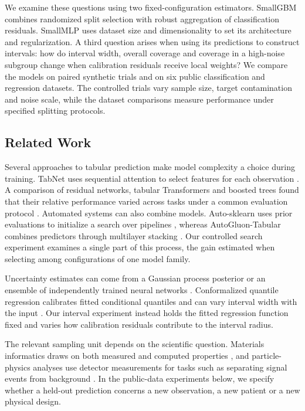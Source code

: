 \documentclass[journal]{IEEEtran}
\begin{document}
We examine these questions using two fixed-configuration estimators. SmallGBM combines randomized split selection with robust aggregation of classification residuals. SmallMLP uses dataset size and dimensionality to set its architecture and regularization. A third question arises when using its predictions to construct intervals: how do interval width, overall coverage and coverage in a high-noise subgroup change when calibration residuals receive local weights? We compare the models on paired synthetic trials and on six public classification and regression datasets. The controlled trials vary sample size, target contamination and noise scale, while the dataset comparisons measure performance under specified splitting protocols.

\subsection{Related Work}

Several approaches to tabular prediction make model complexity a choice during training. TabNet uses sequential attention to select features for each observation \cite{arik2021tabnet}. A comparison of residual networks, tabular Transformers and boosted trees found that their relative performance varied across tasks under a common evaluation protocol \cite{gorishniy2021revisiting}. Automated systems can also combine models. Auto-sklearn uses prior evaluations to initialize a search over pipelines \cite{feurer2015automl}, whereas AutoGluon-Tabular combines predictors through multilayer stacking \cite{erickson2020autogluon}. Our controlled search experiment examines a single part of this process, the gain estimated when selecting among configurations of one model family.

Uncertainty estimates can come from a Gaussian process posterior \cite{rasmussen2006gpml} or an ensemble of independently trained neural networks \cite{lakshminarayanan2017ensembles}. Conformalized quantile regression calibrates fitted conditional quantiles and can vary interval width with the input \cite{romano2019cqr}. Our interval experiment instead holds the fitted regression function fixed and varies how calibration residuals contribute to the interval radius.

The relevant sampling unit depends on the scientific question. Materials informatics draws on both measured and computed properties \cite{ramprasad2017materials}, and particle-physics analyses use detector measurements for tasks such as separating signal events from background \cite{radovic2018physics}. In the public-data experiments below, we specify whether a held-out prediction concerns a new observation, a new patient or a new physical design.
\end{document}
